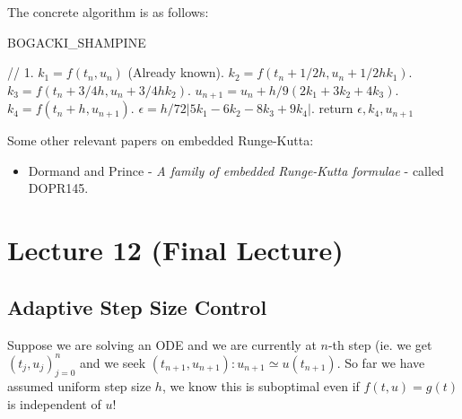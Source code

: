 \documentclass{article}
\begin{document}
The concrete algorithm is as follows:
\begin{tcolorbox}[standard jigsaw,opacityback=0]
\begin{algorithm}[H]
\caption{BOGACKI\_SHAMPINE}
// 1. $k_1 = f(t_n, u_n)$ (Already known). $k_2 = f(t_n + 1/2h, u_n + 1/2 h k_1)$. $k_3 = f(t_n + 3/4 h, u_n + 3/4 h k_2)$. $u_{n+1} = u_n + h/9 (2 k_1 + 3 k_2 + 4 k_3)$. $k_4 = f(t_n + h, u_{n+1})$. $\epsilon = h/72 | 5 k_1 - 6 k_2 - 8 k_3 + 9 k_4|$. return $\epsilon, k_4, u_{n+1}$
\end{algorithm}
\end{tcolorbox}

Some other relevant papers on embedded Runge-Kutta:
\begin{itemize}
    \item Dormand and Prince - \textit{A family of embedded Runge-Kutta formulae} - called DOPR145.
\end{itemize}

\newpage
\section{Lecture 12 (Final Lecture)}

\subsection{Adaptive Step Size Control}

Suppose we are solving an ODE and we are currently at $n$-th step (ie. we get $(t_j, u_j)_{j = 0}^n$ and we seek $(t_{n+1}, u_{n+1}): u_{n+1} \simeq u(t_{n+1})$. So far we have assumed uniform step size $h$, we know this is suboptimal even if $f(t, u) = g(t)$ is independent of $u$!\\
\end{document}
